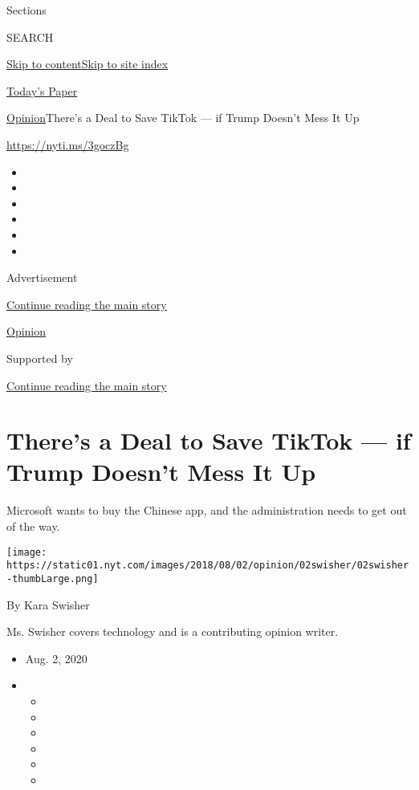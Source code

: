 Sections

SEARCH

\protect\hyperlink{site-content}{Skip to
content}\protect\hyperlink{site-index}{Skip to site index}

\href{https://myaccount.nytimes.com/auth/login?response_type=cookie\&client_id=vi}{}

\href{https://www.nytimes.com/section/todayspaper}{Today's Paper}

\href{/section/opinion}{Opinion}\textbar{}There's a Deal to Save TikTok
--- if Trump Doesn't Mess It Up

\url{https://nyti.ms/3goczBg}

\begin{itemize}
\item
\item
\item
\item
\item
\item
\end{itemize}

Advertisement

\protect\hyperlink{after-top}{Continue reading the main story}

\href{/section/opinion}{Opinion}

Supported by

\protect\hyperlink{after-sponsor}{Continue reading the main story}

\hypertarget{theres-a-deal-to-save-tiktok--if-trump-doesnt-mess-it-up}{%
\section{There's a Deal to Save TikTok --- if Trump Doesn't Mess It
Up}\label{theres-a-deal-to-save-tiktok--if-trump-doesnt-mess-it-up}}

Microsoft wants to buy the Chinese app, and the administration needs to
get out of the way.

\texttt{[image: https://static01.nyt.com/images/2018/08/02/opinion/02swisher/02swisher-thumbLarge.png]}

By Kara Swisher

Ms. Swisher covers technology and is a contributing opinion writer.

\begin{itemize}
\item
  Aug. 2, 2020
\item
  \begin{itemize}
  \item
  \item
  \item
  \item
  \item
  \item
  \end{itemize}
\end{itemize}

